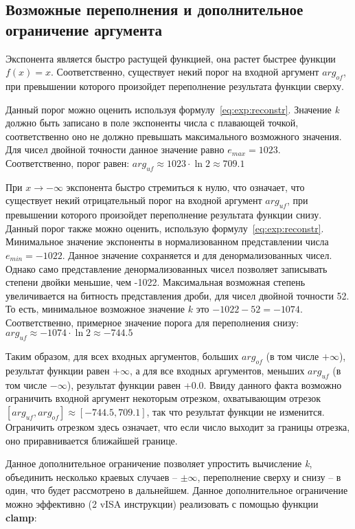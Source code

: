 \subsection{Возможные переполнения и дополнительное ограничение аргумента}

Экспонента является быстро растущей функцией, она растет быстрее функции $f(x) = x$.
Соответственно, существует некий порог на входной аргумент $arg_{of}$, при превышении которого произойдет переполнение результата функции сверху.

Данный порог можно оценить используя формулу~\ref{eq:exp:reconstr}.
Значение \textit{k} должно быть записано в поле экспоненты числа с плавающей точкой, соответственно оно не должно превышать максимального возможного значения.
Для чисел двойной точности данное значение равно $e_{max} = 1023$.
Соответственно, порог равен: $arg_{uf} \approx 1023 \cdot \ln{2} \approx 709.1$

При $x \to -\infty$ экспонента быстро стремиться к нулю, что означает, что существует некий отрицательный порог на входной аргумент $arg_{uf}$, при превышении которого произойдет переполнение результата функции снизу.
Данный порог также можно оценить, использую формулу~\ref{eq:exp:reconstr}.
Минимальное значение экспоненты в нормализованном представлении числа $e_{min} = -1022$.
Данное значение сохраняется и для денормализованных чисел.
Однако само представление денормализованных чисел позволяет записывать степени двойки меньшие, чем -1022.
Максимальная возможная степень увеличивается на битность представления дроби, для чисел двойной точности 52.
То есть, минимальное возможное значение $k$ это $-1022 - 52 = -1074$.
Соответственно, примерное значение порога для переполнения снизу: $arg_{uf} \approx -1074 \cdot \ln{2} \approx -744.5$

Таким образом, для всех входных аргументов, больших $arg_{of}$ (в том числе $+\infty$), результат функции равен $+\infty$, а для все входных аргументов, меньших $arg_{uf}$ (в том числе $-\infty$), результат функции равен +0.0.
Ввиду данного факта возможно ограничить входной аргумент некоторым отрезком, охватывающим отрезок $[arg_{uf}, arg_{of}] \approx [-744.5, 709.1]$, так что результат функции не изменится.
Ограничить отрезком здесь означает, что если число выходит за границы отрезка, оно приравнивается ближайшей границе.

Данное дополнительное ограничение позволяет упростить вычисление \textit{k}, объединить несколько краевых случаев -- $\pm \infty$, переполнение сверху и снизу -- в один, что будет рассмотрено в дальнейшем.
Данное дополнительное ограничение можно эффективно (2 vISA инструкции) реализовать с помощью функции \textbf{clamp}:

